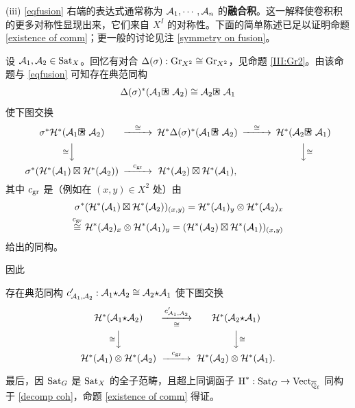 (iii) \eqref{eqfusion} 右端的表达式通常称为 ${\mathcal A}_1,\cdots,{\mathcal A}_n$ 的\textbf{融合积}。这一解释使卷积积的更多对称性显现出来，它们来自 $X^I$ 的对称性。下面的简单陈述已足以证明命题 \ref{existence of comm}；更一般的讨论见注 \ref{symmetry on fusion}。

设 ${\mathcal A}_1,{\mathcal A}_2\in{\operatorname{Sat}}_X$。回忆有对合 $\Delta(\sigma):{\operatorname{Gr}}_{X^2}\cong{\operatorname{Gr}}_{X^2}$，见命题 \ref{III:Gr2}。由该命题与 \eqref{eqfusion} 可知存在典范同构
\[\Delta(\sigma)^*(\mA_1\boxstar\mA_2)\cong \mA_2\boxstar\mA_1\]
使下图交换
\[\begin{CD}
\sigma^*\mH^*(\mA_1\boxstar\mA_2)@>\cong>> \mH^*\Delta(\sigma)^*(\mA_1\boxstar\mA_2)@>\cong>>\mH^*(\mA_2\boxstar\mA_1)\\
@V\cong VV & & @VV\cong V\\
\sigma^*(\mH^*(\mA_1)\boxtimes\mH^*(\mA_2))@>c_{\on{gr}}>> \mH^*(\mA_2)\boxtimes\mH^*(\mA_1),
\end{CD}\]
其中 $c_{\operatorname{gr}}$ 是（例如在 $(x,y)\in X^2$ 处）由
\[\begin{split}\sigma^*({\mathcal H}^*({\mathcal A}_1)\boxtimes{\mathcal H}^*({\mathcal A}_2))_{(x,y)}={\mathcal H}^*({\mathcal A}_1)_y\otimes{\mathcal H}^*({\mathcal A}_2)_x \\ \stackrel{c_{\operatorname{gr}}}{\cong}{\mathcal H}^*({\mathcal A}_2)_x\otimes {\mathcal H}^*({\mathcal A}_1)_y=({\mathcal H}^*({\mathcal A}_2)\boxtimes{\mathcal H}^*({\mathcal A}_1))_{(x,y)}\end{split}\]
给出的同构。

因此

\begin{cor}\label{existence of comm2}
存在典范同构 $c'_{{\mathcal A}_1,{\mathcal A}_2}:{\mathcal A}_1\text{$\star$}{\mathcal A}_2\cong{\mathcal A}_2\text{$\star$}{\mathcal A}_1$ 使下图交换
\[\begin{CD}
\mH^*(\mA_1\ostar\mA_2)@>c'_{\mA_1,\mA_2}>\cong>\mH^*(\mA_2\ostar\mA_1)\\
@V\cong VV@VV\cong V\\
\mH^*(\mA_1)\otimes\mH^*(\mA_2)@>c_{\on{gr}}>>\mH^*(\mA_2)\otimes\mH^*(\mA_1).
\end{CD}\]
\end{cor}

最后，因 ${\operatorname{Sat}}_G$ 是 ${\operatorname{Sat}}_X$ 的全子范畴，且超上同调函子 $\operatorname{H}^*:{\operatorname{Sat}}_G\to \operatorname{Vect}_{{\overline{{\mathbb Q}}_\ell}}$ 同构于 \eqref{decomp coh}，命题 \ref{existence of comm} 得证。

